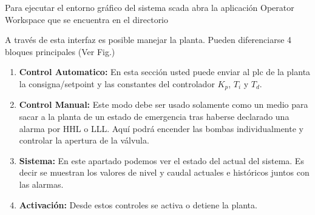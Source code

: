 Para ejecutar el entorno gráfico del sistema \gls{scada} abra la aplicación
Operator Workspace que se encuentra en el directorio

A través de esta interfaz es posible manejar la planta.
Pueden diferenciarse 4 bloques principales (Ver Fig.)
\begin{enumerate}
 \item \textbf{Control Automatico:} En esta sección usted puede enviar al
\gls{plc} de la planta la consigna/setpoint y las constantes del controlador
$K_p$, $T_i$ y $T_d$.
 \item \textbf{Control Manual:} Este modo debe ser usado solamente como un
medio para
sacar a la planta de un estado de emergencia tras  haberse declarado una alarma
por HHL o LLL.
Aquí podrá encender las bombas individualmente y controlar la apertura de la
válvula.
 \item \textbf{Sistema:} En este apartado podemos ver el estado del actual del
sistema.
Es decir se muestran los valores de nivel y caudal actuales e históricos juntos
con las alarmas.
 \item \textbf{Activación:} Desde estos controles se activa o detiene la
planta.
\end{enumerate}
